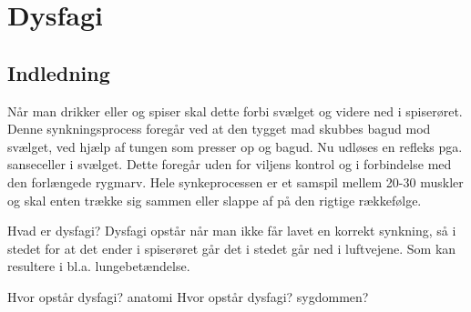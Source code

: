 \chapter{Dysfagi}
\section{Indledning}
Når man drikker eller og spiser skal dette forbi svælget og videre ned i spiserøret. Denne synkningsprocess foregår ved at den tygget mad skubbes bagud mod svælget, ved hjælp af tungen som presser op og bagud. Nu udløses en refleks pga. sanseceller i svælget. Dette foregår uden for viljens kontrol og i forbindelse med den forlængede rygmarv. Hele synkeprocessen er et samspil mellem 20-30 muskler og skal enten trække sig sammen eller slappe af på den rigtige rækkefølge. \cite{Sand2008MennesketsFysiologi}

Hvad er dysfagi?
Dysfagi opstår når man ikke får lavet en korrekt synkning, så i stedet for at det ender i spiserøret går det i stedet går ned i luftvejene. Som kan resultere i bl.a. lungebetændelse.\cite{Kjaersgaard2013DifficultiesPerspective}



Hvor opstår dysfagi? anatomi 
Hvor opstår dysfagi? sygdommen?

%
